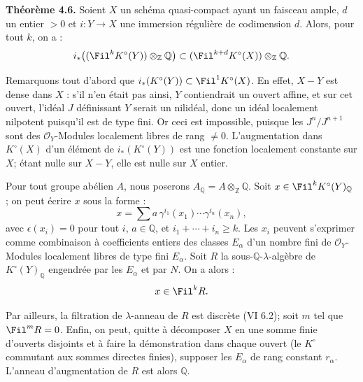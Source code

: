 \textbf{Théorème 4.6.}
Soient \(X\) un schéma quasi-compact ayant un faisceau ample, \(d\) un entier \(>0\) et \(i:Y\to X\) une immersion régulière de codimension \(d\). Alors, pour tout \(k\), on a :
\[
 i_*\bigl((\Fil^kK^\circ(Y))\otimes_{\mathbb Z}\mathbb Q\bigr)
 \subset
 (\Fil^{k+d}K^\circ(X))\otimes_{\mathbb Z}\mathbb Q.
\]

Remarquons tout d'abord que \(i_*(K^\circ(Y))\subset \Fil^1K^\circ(X)\). En effet, \(X-Y\) est dense dans \(X\) : s'il n'en était pas ainsi, \(Y\) contiendrait un ouvert affine, et sur cet ouvert, l'idéal \(J\) définissant \(Y\) serait un nilidéal, donc un idéal localement nilpotent puisqu'il est de type fini. Or ceci est impossible, puisque les \(J^n/J^{n+1}\) sont des \(\mathcal O_Y\)-Modules localement libres de rang \(\ne0\). L'augmentation dans \(K^\circ(X)\) d'un élément de \(i_*(K^\circ(Y))\) est une fonction localement constante sur \(X\); étant nulle sur \(X-Y\), elle est nulle sur \(X\) entier.

Pour tout groupe abélien \(A\), nous poserons \(A_{\mathbb Q}=A\otimes_{\mathbb Z}\mathbb Q\). Soit \(x\in\Fil^kK^\circ(Y)_{\mathbb Q}\) ; on peut écrire \(x\) sous la forme :
\[
  x=\sum a\,\gamma^{i_1}(x_1)\cdots\gamma^{i_n}(x_n),
\]
avec \(\epsilon(x_i)=0\) pour tout \(i\), \(a\in\mathbb Q\), et \(i_1+\cdots+i_n\ge k\). Les \(x_i\) peuvent s'exprimer comme combinaison à coefficients entiers des classes \(E_\alpha\) d'un nombre fini de \(\mathcal O_Y\)-Modules localement libres de type fini \(E_\alpha\). Soit \(R\) la sous-\(\mathbb Q\)-\(\lambda\)-algèbre de \(K^\circ(Y)_{\mathbb Q}\) engendrée par les \(E_\alpha\) et par \(N\). On a alors :
\[
  x\in\Fil^kR.
\]

Par ailleurs, la filtration de \(\lambda\)-anneau de \(R\) est discrète (VI 6.2); soit \(m\) tel que \(\Fil^mR=0\). Enfin, on peut, quitte à décomposer \(X\) en une somme finie d'ouverts disjoints et à faire la démonstration dans chaque ouvert (le \(K^\circ\) commutant aux sommes directes finies), supposer les \(E_\alpha\) de rang constant \(r_\alpha\). L'anneau d'augmentation de \(R\) est alors \(\mathbb Q\).

